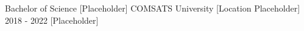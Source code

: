
\begin{cventries}

  \cventry
    {Bachelor of Science [Placeholder]} %
    {COMSATS University} %
    {[Location Placeholder]} %
    {2018 - 2022 [Placeholder]} %
    {}

\end{cventries}

